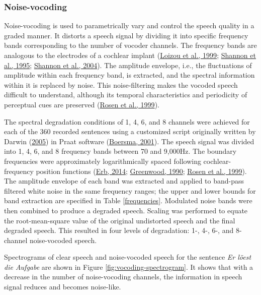 \documentclass[a4paper, nobind]{templates/ociamthesis}
\begin{document}
\hypertarget{noise-vocoding}{%
\subsubsection{Noise-vocoding}\label{noise-vocoding}}

Noise-vocoding is used to parametrically vary and control the speech quality in a graded manner.
It distorts a speech signal by dividing it into specific frequency bands corresponding to the number of vocoder channels.
The frequency bands are analogous to the electrodes of a cochlear implant (\protect\hyperlink{ref-Loizou1999}{Loizou et al., 1999}; \protect\hyperlink{ref-Shannon1995}{Shannon et al., 1995}; \protect\hyperlink{ref-Shannon2004}{Shannon et al., 2004}).
The amplitude envelope, i.e., the fluctuations of amplitude within each frequency band, is extracted, and the spectral information within it is replaced by noise.
This noise-filtering makes the vocoded speech difficult to understand, although its temporal characteristics and periodicity of perceptual cues are preserved (\protect\hyperlink{ref-Rosen1999}{Rosen et al., 1999}).

The spectral degradation conditions of 1, 4, 6, and 8 channels were achieved for each of the 360 recorded sentences using a customized script originally written by Darwin (\protect\hyperlink{ref-Darwin2005}{2005}) in Praat software (\protect\hyperlink{ref-Praat2001}{Boersma, 2001}).
The speech signal was divided into 1, 4, 6, and 8 frequency bands between 70 and 9,000Hz.
The boundary frequencies were approximately logarithmically spaced following cochlear-frequency position functions (\protect\hyperlink{ref-Erb2014}{Erb, 2014}; \protect\hyperlink{ref-Greenwood1990}{Greenwood, 1990}; \protect\hyperlink{ref-Rosen1999}{Rosen et al., 1999}).
The amplitude envelope of each band was extracted and applied to band-pass filtered white noise in the same frequency ranges;
the upper and lower bounds for band extraction are specified in Table \ref{frequencies}.
Modulated noise bands were then combined to produce a degraded speech.
Scaling was performed to equate the root-mean-square value of the original undistorted speech and the final degraded speech.
This resulted in four levels of degradation: 1-, 4-, 6-, and 8-channel noise-vocoded speech.

Spectrograms of clear speech and noise-vocoded speech for the sentence \emph{Er löest die Aufgabe} are shown in Figure \ref{fig:vocoding-spectrogram}. It shows that with a decrease in the number of noise-vocoding channels, the information in speech signal reduces and becomes noise-like.
\end{document}
